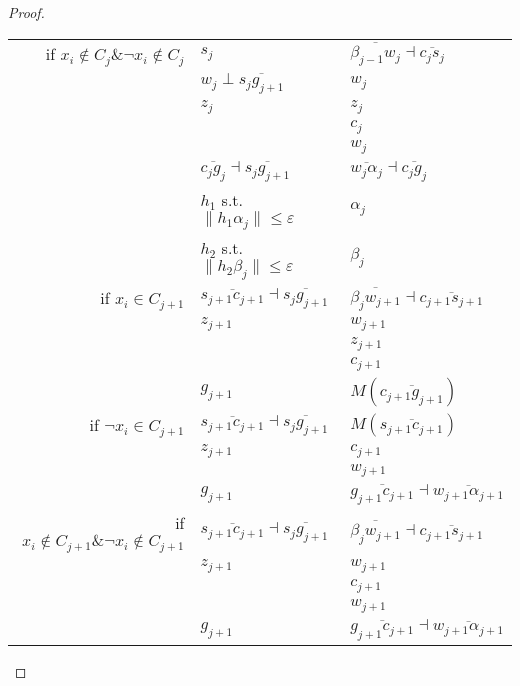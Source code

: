 \documentclass[a4paper,UKenglish]{lipics}
\newcommand{\eps}{\varepsilon}
\newcommand{\Seg}[1]{{\overline{#1}}}
\begin{document}
\begin{proof}
\begin{table}[h]
\begin{tabular}{ r | l | l  }
   if $x_i \notin C_j \& \neg x_i \notin C_j$  & $s_j$ & $\Seg{\beta_{j-1}w_j}	\dashv \Seg{c_js_j}$\\
	&$w_j \perp \Seg{s_jg_{j+1}}$  & $w_j$\\
	&$z_j$  & $z_j$\\

	& &$c_j$\\
	& &$w_j$\\
& $\Seg{c_jg_j} \dashv \Seg{s_jg_{j+1}} $ & $\Seg{w_{j}\alpha_{j}} \dashv \Seg{c_{j}g_{j}}$ \\

\hline
	&  $h_1$ s.t.  $\| h_1\alpha_j \| \le \eps$ & $\alpha_j$\\
	&  	$h_2$ s.t.  $\| h_2 \beta_j \| \le \eps$ & $\beta_j$\\





\hline
if $x_i \in C_{j+1}$ &  $\Seg{s_{j+1}c_{j+1}}	\dashv \Seg{s_{j}g_{j+1}}$    & $\Seg{\beta_jw_{j+1}}	\dashv \Seg{c_{j+1}s_{j+1}}$\\
& $z_{j+1}$ & $w_{j+1}$\\
&  & $z_{j+1}$\\
&  & $c_{j+1}$ \\
&  $g_{j+1}$ & $M(\Seg{c_{j+1}g_{j+1}})$\\




if $\neg x_i \in C_{j+1}$ &  			$\Seg{s_{j+1}c_{j+1}}	\dashv \Seg{s_{j}g_{j+1}}$  & $M(\Seg{s_{j+1}c_{j+1}})$\\
 & $z_{j+1}$ & $c_{j+1}$ \\
 &  & $w_{j+1}$ \\
 &  $g_{j+1}$ & $\Seg{g_{j+1}c_{j+1}}	\dashv \Seg{w_{j+1}\alpha_{j+1}}$ \\






if $x_i \notin C_{j+1} \& \neg x_i \notin C_{j+1}$ &  	$\Seg{s_{j+1}c_{j+1}}	\dashv \Seg{s_{j}g_{j+1}}$  & $\Seg{\beta_jw_{j+1}}	\dashv \Seg{c_{j+1}s_{j+1}}$\\
& $z_{j+1}$ & $w_{j+1}$\\
 & & $c_{j+1}$ \\
 & & $w_{j+1}$ \\
&  $g_{j+1}$ & $\Seg{g_{j+1}c_{j+1}}	\dashv \Seg{w_{j+1}\alpha_{j+1}}$ \\






\end{tabular}
\end{table}
\end{proof}
\end{document}
